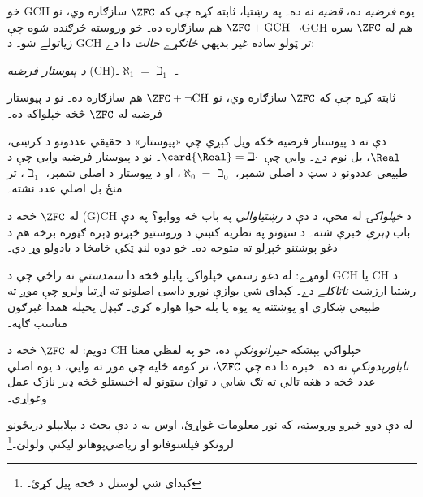 \documentclass[../../../include/open-logic-section]{subfiles}
\begin{document}
خو GCH يوه \emph{فرضيه} ده، \emph{قضيه} نه ده۔ په رښتيا،
\citet{Godel1938} ثابته کړه چې که $\ZFC$ سازګاره وي، نو
$\ZFC + \text{GCH}$ هم سازګاره ده۔ خو وروسته څرګنده شوه
چې $\lnot$GCH هم له $\ZFC$ سره زياتولے شو۔ د GCH تر ټولو
ساده غير بديهي \emph{ځانګړے حالت} دا دے:

\begin{defish}
\emph{د پيوستار فرضيه} (CH)۔ $\aleph_1 = \beth_1$۔
\end{defish}

\citet{Cohen1963} ثابته کړه چې که $\ZFC$ سازګاره وي، نو
$\ZFC + \lnot\text{CH}$ هم سازګاره ده۔ نو د پيوستار فرضيه
له $\ZFC$ څخه خپلواکه ده۔

دې ته د پيوستار فرضيه ځکه ويل کېږي چې «پيوستار» د حقيقي عددونو
د کرښې، $\Real$، بل نوم دے۔
 وايي چې $\card{\Real} =
\beth_1$۔ نو د پيوستار فرضيه وايي چې د طبيعي عددونو د سټ د
اصلي شمېر، $\aleph_0 = \beth_0$، او د پيوستار د اصلي شمېر،
$\beth_1$، تر منځ بل اصلي عدد نشته۔

له $\ZFC$ څخه د (G)CH د \emph{خپلواکۍ} له مخې، د دې د
\emph{رښتياوالي} په باب څه ووايو؟ په دې باب \emph{ډېرې}
خبرې شته۔ د سټونو په نظريه کښې د وروستيو څېړنو ډېره ګټوره
برخه هم د دغو پوښتنو څېړلو ته متوجه ده۔ خو دوه لنډ ټکي
خامخا د يادولو وړ دي۔

لومړے: له دغو رسمي خپلواکۍ پايلو څخه دا \emph{سمدستي}
نه راځي چې د GCH يا CH د رښتيا ارزښت \emph{ناتاکلے}
دے۔ کېدای شي يوازې نورو داسې اصلونو ته اړتيا ولرو چې موږ
ته طبيعي ښکاري او پوښتنه په يوه يا بله خوا هواره کړي۔
ګېډل پخپله همدا غبرګون مناسب ګاڼه۔

دويم: له $\ZFC$ څخه د CH خپلواکي بېشکه \emph{حيرانوونکې}
ده، خو په لفظي معنا \emph{ناباورېدونکې} نه ده۔ خبره دا ده چې
$\ZFC$، تر کومه ځايه چې موږ ته وايي، د يوه اصلي عدد څخه د
هغه تالي ته تګ ښايي د توان سټونو له اخيستلو څخه ډېر نازک
عمل وغواړي۔

له دې دوو خبرو وروسته، که نور معلومات غواړئ، اوس به د دې
بحث د بېلابېلو دريځونو لرونکو فيلسوفانو او رياضي‌پوهانو
ليکنې ولولئ۔\footnote{کېدای شي لوستل د \citet[\S15.6]{Potter2004}
څخه پيل کړئ۔}
\end{document}
